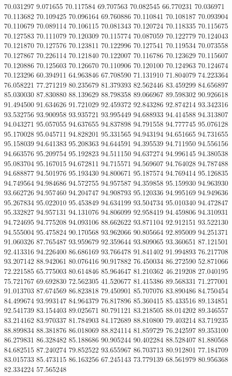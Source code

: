 70.031297
9.071655
70.117584
69.707563
70.082545
66.770231
70.036971
70.113682
70.109425
70.096164
69.760886
70.110841
70.108187
70.093904
70.110679
70.089114
70.106115
70.081343
70.120724
70.118335
70.115675
70.127583
70.111079
70.120309
70.115774
70.087059
70.122779
70.124043
70.121870
70.127576
70.123811
70.122996
70.127541
70.119534
70.073558
70.127867
70.226114
70.121840
70.122007
70.116786
70.123629
70.115607
70.120886
70.125603
70.126670
70.110906
70.120100
70.124963
70.124674
70.123296
60.394911
64.963846
67.708590
71.131910
71.804079
74.223364
76.058221
77.271219
80.235679
81.379393
82.562446
83.459299
84.656897
85.030030
87.830880
88.139629
88.798358
89.066967
89.598302
90.926618
91.494500
91.634626
91.721029
92.459372
92.843286
92.874214
93.342316
93.532756
93.900958
93.935721
93.995449
94.688933
94.414588
94.313807
94.043271
95.057055
94.637655
94.837898
94.791558
94.777745
95.076128
95.170028
95.045711
94.828201
95.331565
94.943194
94.651665
94.731655
95.158039
94.641383
95.208363
94.644591
94.395539
94.711950
94.556156
94.663576
95.209754
95.192823
94.511150
94.637274
94.996145
94.380538
95.083704
95.167015
94.672811
94.715571
94.569607
94.764028
94.787488
94.688877
94.501976
95.193430
94.800671
95.187574
94.769414
95.126835
94.749564
94.984686
94.572755
94.957587
94.359858
95.159930
94.963930
93.662726
94.957460
94.204747
94.908793
95.120336
94.995169
94.949636
95.267834
95.022010
95.453849
94.634199
93.504734
95.010340
94.472847
95.332827
94.957131
94.131076
94.806099
92.958419
94.459806
94.310931
94.724695
94.775208
94.093106
88.662622
93.871104
92.912151
93.522130
94.555004
95.475824
90.170568
93.962066
90.805664
92.895009
94.251371
91.060326
87.765487
93.959679
92.359644
93.809065
93.360651
87.121501
92.413316
94.226400
86.686169
93.766478
91.841402
91.994893
76.217708
93.207142
88.942061
80.076416
90.917882
76.450034
86.272590
52.871066
72.221585
65.775003
80.614846
85.964647
81.210362
46.219208
27.040195
75.721767
69.692830
72.562305
41.520677
81.415386
89.568331
71.277001
91.013703
87.674569
86.823818
79.450901
85.707076
83.890486
84.750454
84.499674
93.993147
84.964379
76.817896
85.360415
85.433516
89.134851
92.541739
83.154403
89.025671
80.791121
83.218505
88.014202
89.346557
83.214162
83.970337
81.784903
84.172689
88.810800
79.403214
83.719235
88.899834
88.381876
86.018069
88.824114
81.859729
76.242597
89.353100
86.279831
86.328482
85.188686
90.905244
90.402284
88.528407
81.880568
84.682515
87.240274
79.852522
93.655967
86.703713
80.912801
77.184709
83.015733
85.473115
86.163256
67.245143
73.779139
68.561979
80.956368
82.334224
57.565248
